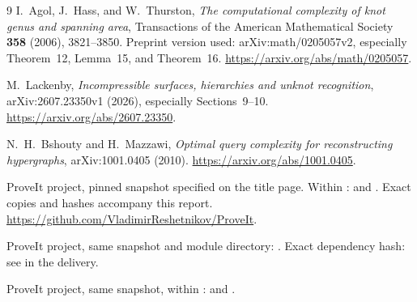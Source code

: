 \documentclass[11pt,letterpaper]{article}
\theoremstyle{definition}
\begin{document}
\small
\begin{thebibliography}{9}
\setlength{\itemsep}{2pt}
I.~Agol, J.~Hass, and W.~Thurston,
\emph{The computational complexity of knot genus and spanning area},
Transactions of the American Mathematical Society \textbf{358} (2006),
3821--3850. Preprint version used: arXiv:math/0205057v2, especially
Theorem~12, Lemma~15, and Theorem~16.
\url{https://arxiv.org/abs/math/0205057}.

M.~Lackenby, \emph{Incompressible surfaces, hierarchies and unknot
recognition}, arXiv:2607.23350v1 (2026), especially Sections~9--10.
\url{https://arxiv.org/abs/2607.23350}.

N.~H.~Bshouty and H.~Mazzawi,
\emph{Optimal query complexity for reconstructing hypergraphs},
arXiv:1001.0405 (2010).
\url{https://arxiv.org/abs/1001.0405}.

ProveIt project, pinned snapshot specified on the title page.
Within :
 and .
Exact copies and hashes accompany this report.
\url{https://github.com/VladimirReshetnikov/ProveIt}.

ProveIt project, same snapshot and module directory:
. Exact dependency hash:
see  in the delivery.

ProveIt project, same snapshot, within :
 and .
\end{thebibliography}
\end{document}
